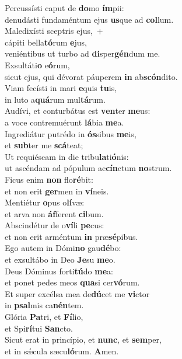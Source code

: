 \evenverse Percussísti caput de \textbf{do}mo \textbf{ím}pii:~\*\\
\evenverse denudásti fundaméntum ejus \textbf{us}que ad \textbf{col}lum.\\
\oddverse Maledixísti sceptris ejus,~+\\
\oddverse  cápiti bella\textbf{tó}rum \textbf{e}jus,~\*\\
\oddverse veniéntibus ut turbo ad \textbf{di}sper\textbf{gén}dum me.\\
\evenverse Exsultáti\textbf{o} e\textbf{ó}rum,~\*\\
\evenverse sicut ejus, qui dévorat páuperem \textbf{in} ab\textbf{scón}dito.\\
\oddverse Viam fecísti in mari \textbf{e}quis \textbf{tu}is,~\*\\
\oddverse in luto a\textbf{quá}rum mul\textbf{tá}rum.\\
\evenverse Audívi, et conturbátus est \textbf{ven}ter \textbf{me}us:~\*\\
\evenverse a voce contremuérunt \textbf{lá}bia \textbf{me}a.\\
\oddverse Ingrediátur putrédo in \textbf{ós}sibus \textbf{me}is,~\*\\
\oddverse et \textbf{sub}ter me \textbf{scá}teat;\\
\evenverse Ut requiéscam in die tribu\textbf{la}ti\textbf{ó}nis:~\*\\
\evenverse ut ascéndam ad pópulum ac\textbf{cín}ctum \textbf{no}strum.\\
\oddverse Ficus enim \textbf{non} flo\textbf{ré}bit:~\*\\
\oddverse et non erit \textbf{ger}men in \textbf{ví}neis.\\
\evenverse Mentiétur \textbf{o}pus o\textbf{lí}væ:~\*\\
\evenverse et arva non \textbf{áf}ferent \textbf{ci}bum.\\
\oddverse Abscindétur de o\textbf{ví}li \textbf{pe}cus:~\*\\
\oddverse et non erit arméntum \textbf{in} præ\textbf{sé}pibus.\\
\evenverse Ego autem in Dómi\textbf{no} gau\textbf{dé}bo:~\*\\
\evenverse et exsultábo in Deo \textbf{Je}su \textbf{me}o.\\
\oddverse Deus Dóminus forti\textbf{tú}do \textbf{me}a:~\*\\
\oddverse et ponet pedes meos \textbf{qua}si cer\textbf{vó}rum.\\
\evenverse Et super excélsa mea de\textbf{dú}cet me \textbf{vi}ctor~\*\\
\evenverse in \textbf{psal}mis ca\textbf{nén}tem.\\
\oddverse Glória \textbf{Pa}tri, et \textbf{Fí}lio,~\*\\
\oddverse et Spi\textbf{rí}tui \textbf{San}cto.\\
\evenverse Sicut erat in princípio, et \textbf{nunc}, et \textbf{sem}per,~\*\\
\evenverse et in sǽcula sæcu\textbf{ló}rum. \textbf{A}men.\\
